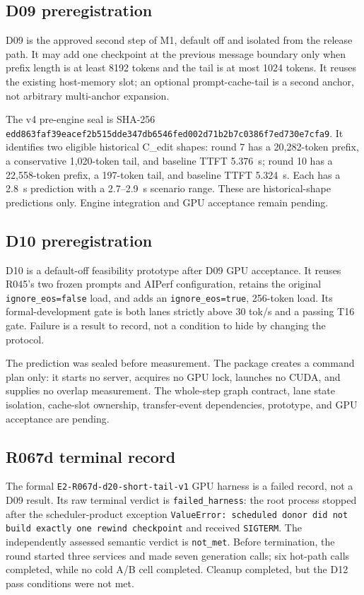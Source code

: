 \documentclass[11pt]{article}
\begin{document}
\subsection{D09 preregistration}

D09 is the approved second step of M1, default off and isolated from the release path. It may add one checkpoint at the previous message boundary only when prefix length is at least 8192 tokens and the tail is at most 1024 tokens. It reuses the existing host-memory slot; an optional prompt-cache-tail is a second anchor, not arbitrary multi-anchor expansion.

The v4 pre-engine seal is SHA-256 \texttt{edd863faf39eacef2b515dde347db6546fed002d71b2b7c0386f7ed730e7cfa9}. It identifies two eligible historical C\_edit shapes: round 7 has a 20,282-token prefix, a conservative 1,020-token tail, and baseline TTFT 5.376~s; round 10 has a 22,558-token prefix, a 197-token tail, and baseline TTFT 5.324~s. Each has a 2.8~s prediction with a 2.7--2.9~s scenario range. These are historical-shape predictions only. Engine integration and GPU acceptance remain pending.

\subsection{D10 preregistration}

D10 is a default-off feasibility prototype after D09 GPU acceptance. It reuses R045's two frozen prompts and AIPerf configuration, retains the original \texttt{ignore\_eos=false} load, and adds an \texttt{ignore\_eos=true}, 256-token load. Its formal-development gate is both lanes strictly above 30 tok/s and a passing T16 gate. Failure is a result to record, not a condition to hide by changing the protocol.

The prediction was sealed before measurement. The package creates a command plan only: it starts no server, acquires no GPU lock, launches no CUDA, and supplies no overlap measurement. The whole-step graph contract, lane state isolation, cache-slot ownership, transfer-event dependencies, prototype, and GPU acceptance are pending.

\subsection{R067d terminal record}
\label{sec:r067d}

The formal \texttt{E2-R067d-d20-short-tail-v1} GPU harness is a failed record, not a D09 result. Its raw terminal verdict is \texttt{failed\_harness}: the root process stopped after the scheduler-product exception \texttt{ValueError: scheduled donor did not build exactly one rewind checkpoint} and received \texttt{SIGTERM}. The independently assessed semantic verdict is \texttt{not\_met}. Before termination, the round started three services and made seven generation calls; six hot-path calls completed, while no cold A/B cell completed. Cleanup completed, but the D12 pass conditions were not met.
\end{document}
